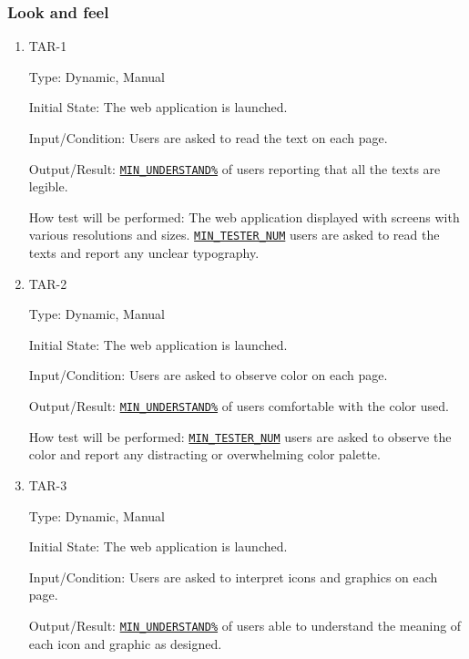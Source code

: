 \documentclass[12pt, titlepage]{article}
\begin{document}
\subsubsection{Look and feel}
		

\begin{enumerate}

\item{TAR-1\\}\label{TAR-1}

Type: Dynamic, Manual
					
Initial State: The web application is launched.
					
Input/Condition: Users are asked to read the text on each page.
					
Output/Result:  \hyperref[MIN_UNDERSTAND]{\texttt{MIN\_UNDERSTAND\%}} of users reporting that all the texts are legible.
					
How test will be performed: The web application displayed with screens with various resolutions and sizes. \hyperref[MIN_TESTER_NUM]{\texttt{MIN\_TESTER\_NUM}} users are asked to read the texts and report any unclear typography.
					
\item{TAR-2\\}\label{TAR-2}

Type: Dynamic, Manual
					
Initial State: The web application is launched.
					
Input/Condition: Users are asked to observe color on each page.
					
Output/Result: \hyperref[MIN_UNDERSTAND]{\texttt{MIN\_UNDERSTAND\%}} of users comfortable with the color used.
					
How test will be performed: \hyperref[MIN_TESTER_NUM]{\texttt{MIN\_TESTER\_NUM}} users are asked to observe the color and report any distracting or overwhelming color palette.

\item{TAR-3\\}\label{TAR-3}

Type: Dynamic, Manual
					
Initial State: The web application is launched.
					
Input/Condition: Users are asked to interpret icons and graphics on each page.
					
Output/Result: \hyperref[MIN_UNDERSTAND]{\texttt{MIN\_UNDERSTAND\%}} of users able to understand the meaning of each icon and graphic as designed.
					

\end{enumerate}
\end{document}
